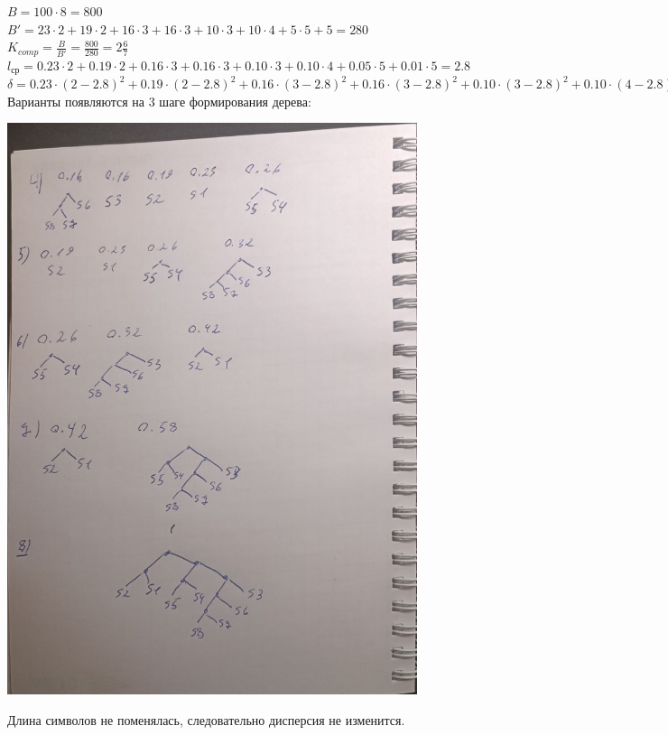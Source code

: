 \documentclass[a4paper,14pt]{extarticle}
\begin{document}
$B = 100 \cdot 8 = 800$\\
$B' = 23 \cdot 2 + 19 \cdot 2 + 16 \cdot 3 + 16 \cdot 3 + 10 \cdot 3 + 10 \cdot 4 + 5 \cdot 5 + 5 = 280$\\
$K_{comp} = \frac{B}{B'} = \frac{800}{280} = 2\frac{6}{7}$\\
$l_{ср} = 0.23 \cdot 2 + 0.19 \cdot 2 + 0.16 \cdot 3 + 0.16 \cdot 3 + 0.10 \cdot 3 + 0.10 \cdot 4 + 0.05 \cdot 5 + 0.01 \cdot 5 = 2.8$\\
$\delta = 0.23 \cdot (2 - 2.8)^2 + 0.19 \cdot (2 - 2.8)^2 + 0.16 \cdot (3 - 2.8)^2 + 0.16 \cdot (3 - 2.8)^2 + 0.10 \cdot (3 - 2.8)^2 + 0.10 \cdot (4 - 2.8)^2 + 0.05 \cdot (5 - 2.8)^2 + 0.01 \cdot (5 - 2.8)^2 = 0.72$\\

Варианты появляются на 3 шаге формирования дерева:
\begin{center}
    \includegraphics[width=120mm]{task1_var1.jpg}\\
\end{center}
Длина символов не поменялась, следовательно дисперсия не изменится.\\
\end{document}
